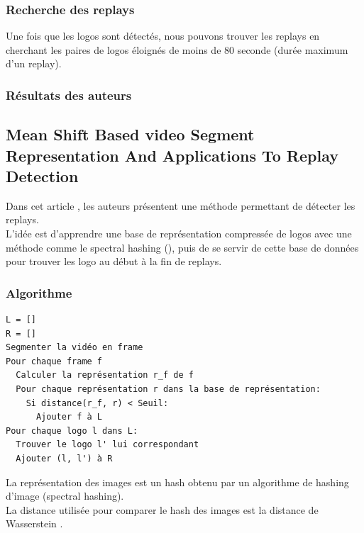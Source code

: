 \documentclass[11pt]{article}
\begin{document}
\subsubsection{Recherche des replays}
\label{sec:org2f6dd34}
Une fois que les logos sont détectés, nous pouvons trouver les replays en cherchant les paires de logos éloignés de moins de 80 seconde (durée maximum d'un replay).\\

\subsubsection{Résultats des auteurs}
\label{sec:orgc856c9e}
\subsection{Mean Shift Based video Segment Representation And Applications To Replay Detection}
\label{sec:org6062219}
Dans cet article \cite{Ling_Yu_Duan}, les auteurs présentent une méthode permettant de détecter les replays.\\
L'idée est d'apprendre une base de représentation compressée de logos avec une méthode comme le spectral hashing (\cite{NIPS2008_3383}), puis de se servir de cette base de données pour trouver les logo au début à la fin de replays.\\
\subsubsection{Algorithme}
\label{sec:org3a117d9}
\begin{verbatim}
L = []
R = []
Segmenter la vidéo en frame
Pour chaque frame f
  Calculer la représentation r_f de f
  Pour chaque représentation r dans la base de représentation:
    Si distance(r_f, r) < Seuil:
      Ajouter f à L
Pour chaque logo l dans L:
  Trouver le logo l' lui correspondant
  Ajouter (l, l') à R
\end{verbatim}
La représentation des images est un hash obtenu par un algorithme de hashing d'image (spectral hashing).\\
La distance utilisée pour comparer le hash des images est la distance de Wasserstein .\\
\end{document}
